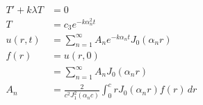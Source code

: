 \documentclass{article}
\begin{document}
\begin{align*}
  T' + k \lambda T                                                                               & = 0                                                                     \\
  T                                                                                              & = c_3 e^{-k \alpha_n^2 t}                                               \\
  u(r, t)                                                                                        & = \sum_{n = 1}^\infty A_n e^{-k \alpha_n t} J_0(\alpha_n r)             \\
  f(r)                                                                                           & = u(r, 0)                                                               \\
                                                                                                 & = \sum_{n = 1}^\infty A_n J_0(\alpha_n r)                               \\
  A_n                                                                                            & = \frac{2}{c^2 J_1^2(\alpha_n c)} \int_0^c r J_0(\alpha_n r) f(r) \,d r
\end{align*}

\setcounter{subsubsection}{10}
\subsubsection{}
\end{document}
